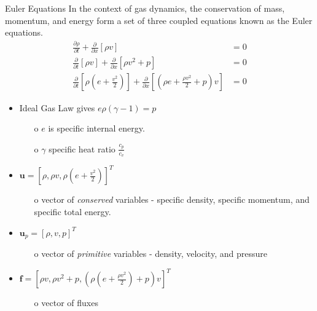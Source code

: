 \documentclass[9pt]{beamer}
\begin{document}
\begin{frame}{Euler Equations}
  In the context of gas dynamics, the conservation of mass, momentum, and energy form a set of three coupled equations known as the Euler equations.
  \begin{align}
    \frac{\partial \rho}{\partial t}+\frac{\partial}{\partial x}[\rho v] &=0\label{eq:MassBalance}\\
    \frac{\partial}{\partial t}[\rho v]+\frac{\partial}{\partial x}[\rho v^2+p]&=0\label{eq:MomentaBalance}\\
    \frac{\partial}{\partial t}[\rho(e+\tfrac{v^2}{2})]+\frac{\partial}{\partial x}[(\rho e+\tfrac{\rho v^2}{2} +p)v]&=0\label{eq:EnergyBalance}
    \end{align} 
  \begin{itemize}
    \item Ideal Gas Law gives $e\rho(\gamma -1)=p$
    \begin{itemize}
      \item[o] $e$ is specific internal energy.  
      \item[o] $\gamma$ specific heat ratio $\frac{c_p}{c_v}$
    \end{itemize}
    \item $\textbf{u}=[\rho,\rho v,\rho(e+\tfrac{v^2}{2})]^T$
    \begin{itemize}
      \item[o] vector of \textit{conserved} variables - specific density, specific momentum, and specific total energy. 
    \end{itemize}
    \item $\textbf{u}_p=[\rho,v, p]^T$
    \begin{itemize}
      \item[o] vector of \textit{primitive} variables - density, velocity, and pressure
    \end{itemize}
    \item $\textbf{f} = [\rho v, \rho v^2 + p, (\rho(e+\tfrac{\rho v^2}{2})+p)v]^T$
    \begin{itemize}
      \item[o] vector of fluxes
    \end{itemize}
  \end{itemize}
\end{frame}
\end{document}
